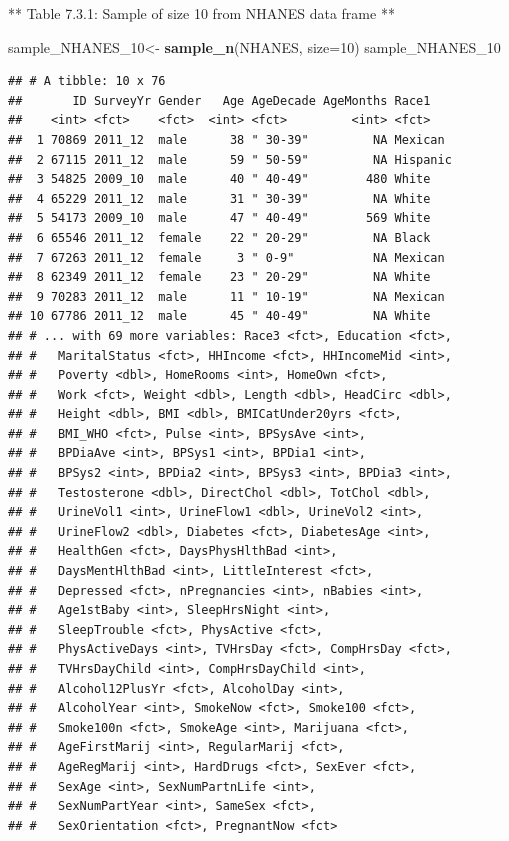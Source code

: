 \documentclass[
]{book}
\newenvironment{Shaded}{\begin{snugshade}}{\end{snugshade}}
\newcommand{\DataTypeTok}[1]{\textcolor[rgb]{0.13,0.29,0.53}{#1}}
\newcommand{\DecValTok}[1]{\textcolor[rgb]{0.00,0.00,0.81}{#1}}
\newcommand{\KeywordTok}[1]{\textcolor[rgb]{0.13,0.29,0.53}{\textbf{#1}}}
\newcommand{\NormalTok}[1]{#1}
\newcommand{\StringTok}[1]{\textcolor[rgb]{0.31,0.60,0.02}{#1}}
\begin{document}
** Table 7.3.1: Sample of size 10 from NHANES data frame **

\begin{Shaded}
\begin{Highlighting}[]
\NormalTok{sample_NHANES_}\DecValTok{10}\NormalTok{<-}
\StringTok{  }\KeywordTok{sample_n}\NormalTok{(NHANES, }\DataTypeTok{size=}\DecValTok{10}\NormalTok{)}
\NormalTok{sample_NHANES_}\DecValTok{10}
\end{Highlighting}
\end{Shaded}

\begin{verbatim}
## # A tibble: 10 x 76
##       ID SurveyYr Gender   Age AgeDecade AgeMonths Race1   
##    <int> <fct>    <fct>  <int> <fct>         <int> <fct>   
##  1 70869 2011_12  male      38 " 30-39"         NA Mexican 
##  2 67115 2011_12  male      59 " 50-59"         NA Hispanic
##  3 54825 2009_10  male      40 " 40-49"        480 White   
##  4 65229 2011_12  male      31 " 30-39"         NA White   
##  5 54173 2009_10  male      47 " 40-49"        569 White   
##  6 65546 2011_12  female    22 " 20-29"         NA Black   
##  7 67263 2011_12  female     3 " 0-9"           NA Mexican 
##  8 62349 2011_12  female    23 " 20-29"         NA White   
##  9 70283 2011_12  male      11 " 10-19"         NA Mexican 
## 10 67786 2011_12  male      45 " 40-49"         NA White   
## # ... with 69 more variables: Race3 <fct>, Education <fct>,
## #   MaritalStatus <fct>, HHIncome <fct>, HHIncomeMid <int>,
## #   Poverty <dbl>, HomeRooms <int>, HomeOwn <fct>,
## #   Work <fct>, Weight <dbl>, Length <dbl>, HeadCirc <dbl>,
## #   Height <dbl>, BMI <dbl>, BMICatUnder20yrs <fct>,
## #   BMI_WHO <fct>, Pulse <int>, BPSysAve <int>,
## #   BPDiaAve <int>, BPSys1 <int>, BPDia1 <int>,
## #   BPSys2 <int>, BPDia2 <int>, BPSys3 <int>, BPDia3 <int>,
## #   Testosterone <dbl>, DirectChol <dbl>, TotChol <dbl>,
## #   UrineVol1 <int>, UrineFlow1 <dbl>, UrineVol2 <int>,
## #   UrineFlow2 <dbl>, Diabetes <fct>, DiabetesAge <int>,
## #   HealthGen <fct>, DaysPhysHlthBad <int>,
## #   DaysMentHlthBad <int>, LittleInterest <fct>,
## #   Depressed <fct>, nPregnancies <int>, nBabies <int>,
## #   Age1stBaby <int>, SleepHrsNight <int>,
## #   SleepTrouble <fct>, PhysActive <fct>,
## #   PhysActiveDays <int>, TVHrsDay <fct>, CompHrsDay <fct>,
## #   TVHrsDayChild <int>, CompHrsDayChild <int>,
## #   Alcohol12PlusYr <fct>, AlcoholDay <int>,
## #   AlcoholYear <int>, SmokeNow <fct>, Smoke100 <fct>,
## #   Smoke100n <fct>, SmokeAge <int>, Marijuana <fct>,
## #   AgeFirstMarij <int>, RegularMarij <fct>,
## #   AgeRegMarij <int>, HardDrugs <fct>, SexEver <fct>,
## #   SexAge <int>, SexNumPartnLife <int>,
## #   SexNumPartYear <int>, SameSex <fct>,
## #   SexOrientation <fct>, PregnantNow <fct>
\end{verbatim}
\end{document}

